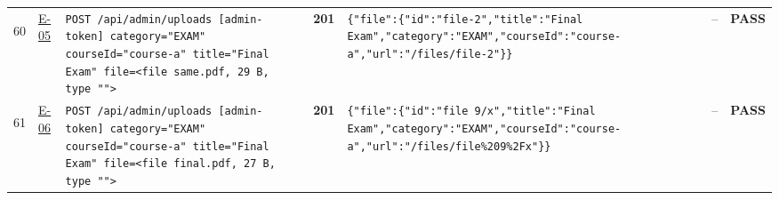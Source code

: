 \documentclass[10pt,a4paper]{article}
\begin{document}
\begin{landscape}
\begin{longtable}{@{}P{0.6cm}P{0.9cm}P{8.5cm}P{1.0cm}P{6.2cm}P{4.2cm}P{1.1cm}@{}}
\hypertarget{call60}{60} & \hyperlink{test-E-05}{E-05} & \texttt{POST /\allowbreak{}api/\allowbreak{}admin/\allowbreak{}uploads [admin-\allowbreak{}token] category=\allowbreak{}"\allowbreak{}EXAM"\allowbreak{} courseId=\allowbreak{}"\allowbreak{}course-\allowbreak{}a"\allowbreak{} title=\allowbreak{}"\allowbreak{}Final Exam"\allowbreak{} file=\allowbreak{}<file same.\allowbreak{}pdf,\allowbreak{} 29 B,\allowbreak{} type "\allowbreak{}"\allowbreak{}>} & \textcolor{passgreen}{\textbf{201}} & \texttt{\{"\allowbreak{}file"\allowbreak{}:\allowbreak{}\{"\allowbreak{}id"\allowbreak{}:\allowbreak{}"\allowbreak{}file-\allowbreak{}2"\allowbreak{},\allowbreak{}"\allowbreak{}title"\allowbreak{}:\allowbreak{}"\allowbreak{}Final Exam"\allowbreak{},\allowbreak{}"\allowbreak{}category"\allowbreak{}:\allowbreak{}"\allowbreak{}EXAM"\allowbreak{},\allowbreak{}"\allowbreak{}courseId"\allowbreak{}:\allowbreak{}"\allowbreak{}course-\allowbreak{}a"\allowbreak{},\allowbreak{}"\allowbreak{}url"\allowbreak{}:\allowbreak{}"\allowbreak{}/\allowbreak{}files/\allowbreak{}file-\allowbreak{}2"\allowbreak{}\}\}} & -- & \textcolor{passgreen}{\textbf{PASS}} \\
\hypertarget{call61}{61} & \hyperlink{test-E-06}{E-06} & \texttt{POST /\allowbreak{}api/\allowbreak{}admin/\allowbreak{}uploads [admin-\allowbreak{}token] category=\allowbreak{}"\allowbreak{}EXAM"\allowbreak{} courseId=\allowbreak{}"\allowbreak{}course-\allowbreak{}a"\allowbreak{} title=\allowbreak{}"\allowbreak{}Final Exam"\allowbreak{} file=\allowbreak{}<file final.\allowbreak{}pdf,\allowbreak{} 27 B,\allowbreak{} type "\allowbreak{}"\allowbreak{}>} & \textcolor{passgreen}{\textbf{201}} & \texttt{\{"\allowbreak{}file"\allowbreak{}:\allowbreak{}\{"\allowbreak{}id"\allowbreak{}:\allowbreak{}"\allowbreak{}file 9/\allowbreak{}x"\allowbreak{},\allowbreak{}"\allowbreak{}title"\allowbreak{}:\allowbreak{}"\allowbreak{}Final Exam"\allowbreak{},\allowbreak{}"\allowbreak{}category"\allowbreak{}:\allowbreak{}"\allowbreak{}EXAM"\allowbreak{},\allowbreak{}"\allowbreak{}courseId"\allowbreak{}:\allowbreak{}"\allowbreak{}course-\allowbreak{}a"\allowbreak{},\allowbreak{}"\allowbreak{}url"\allowbreak{}:\allowbreak{}"\allowbreak{}/\allowbreak{}files/\allowbreak{}file\%209\%2Fx"\allowbreak{}\}\}} & -- & \textcolor{passgreen}{\textbf{PASS}} \\

\end{longtable}
\end{landscape}
\end{document}

